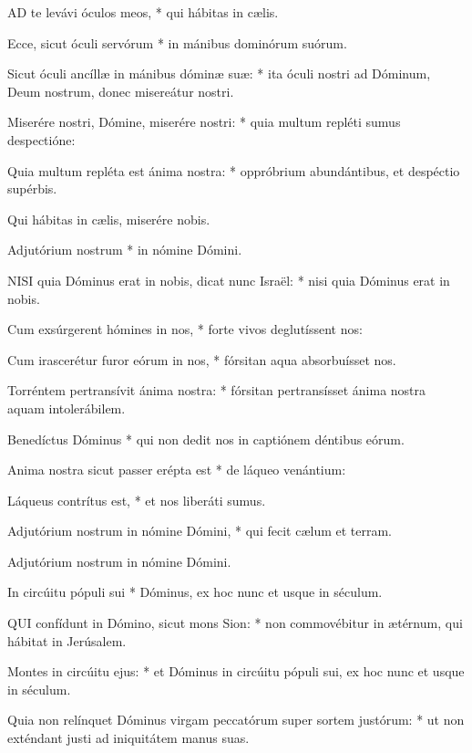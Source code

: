 
\lettrine[lines=2]{A}{D} te levávi óculos meos, * qui hábitas in cælis.

Ecce, sicut óculi servórum * in mánibus dominórum suórum.

Sicut óculi ancíllæ in mánibus dóminæ suæ: * ita óculi nostri ad Dóminum, Deum nostrum, donec misereátur nostri.

Miserére nostri, Dómine, miserére nostri: * quia multum repléti sumus despectióne:

Quia multum repléta est ánima nostra: * oppróbrium abundántibus, et despéctio supérbis.

 Qui hábitas in cælis, miserére nobis.

 Adjutórium nostrum * in nómine Dómini.


\lettrine[lines=2]{N}{ISI} quia Dóminus erat in nobis, dicat nunc Israël: * nisi quia Dóminus erat in nobis.

Cum exsúrgerent hómines in nos, * forte vivos deglutíssent nos:

Cum irascerétur furor eórum in nos, * fórsitan aqua absorbuísset nos.

Torréntem pertransívit ánima nostra: * fórsitan pertransísset ánima nostra aquam intolerábilem.

Benedíctus Dóminus * qui non dedit nos in captiónem déntibus eórum.

Anima nostra sicut passer erépta est * de láqueo venántium:

Láqueus contrítus est, * et nos liberáti sumus.

Adjutórium nostrum in nómine Dómini, * qui fecit cælum et terram.

 Adjutórium nostrum in nómine Dómini.

 In circúitu pópuli sui * Dóminus, ex hoc nunc et usque in séculum.


\lettrine[lines=2]{Q}{UI} confídunt in Dómino, sicut mons Sion: * non commovébitur in ætérnum, qui hábitat in Jerúsalem.

Montes in circúitu ejus: * et Dóminus in circúitu pópuli sui, ex hoc nunc et usque in séculum.

Quia non relínquet Dóminus virgam peccatórum super sortem justórum: * ut non exténdant justi ad iniquitátem manus suas.

